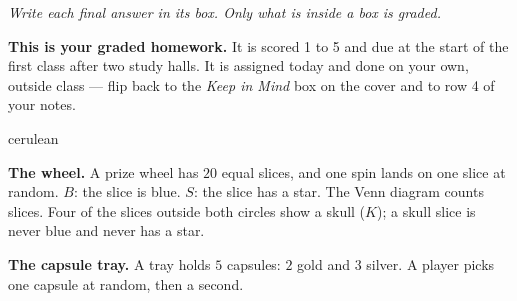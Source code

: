 \documentclass[12pt]{article}
\begin{document}
{\small\itshape Write each final answer in its box. Only what is inside a box is graded.}\par

\vspace{0.08in}

\begin{remindbox}
\small
\textbf{This is your graded homework.} It is scored 1 to 5 and due at the start of the first
class after two study halls. It is assigned today and done on your own, outside class --- flip
back to the \emph{Keep in Mind} box on the cover and to row 4 of your notes.
\end{remindbox}

\vspace{0.06in}

\boxguard[20]
\begin{scenariobox}{cerulean}
\small
\begin{minipage}[c]{0.52\linewidth}
\textbf{The wheel.} A prize wheel has $20$ equal slices, and one spin lands on one slice at
random. $B$: the slice is blue. $S$: the slice has a star. The Venn diagram counts slices. Four
of the slices outside both circles show a skull ($K$); a skull slice is never blue and never
has a star.
\end{minipage}\hfill
\begin{minipage}[c]{0.44\linewidth}\centering
{}
\end{minipage}
\par\vspace{4pt}
\textbf{The capsule tray.} A tray holds $5$ capsules: $2$ gold and $3$ silver. A player picks one
capsule at random, then a second.
\end{scenariobox}
\end{document}

